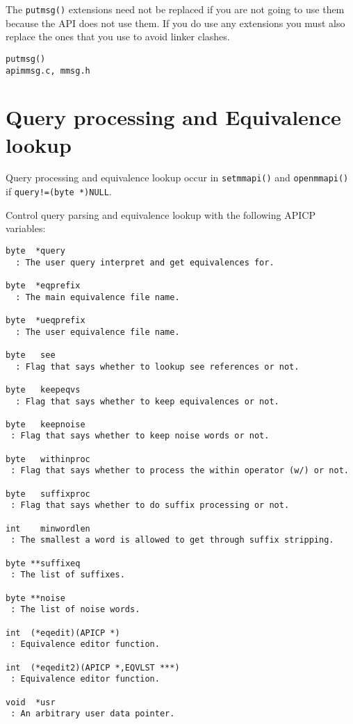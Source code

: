 The \verb`putmsg()` extensions need not be replaced if you are not going
to use them because the API does not use them.  If you do use any
extensions you must also replace the ones that you use to avoid
linker clashes.

\SEE
\begin{verbatim}
putmsg()
apimmsg.c, mmsg.h
\end{verbatim}

\section {Query processing and Equivalence lookup}

Query processing and equivalence lookup occur in \verb`setmmapi()` and
\verb`openmmapi()` if \verb`query!=(byte *)NULL`.

Control query parsing and equivalence lookup with the following
APICP variables:

\begin{verbatim}
byte  *query
  : The user query interpret and get equivalences for.

byte  *eqprefix
  : The main equivalence file name.

byte  *ueqprefix
  : The user equivalence file name.

byte   see
  : Flag that says whether to lookup see references or not.

byte   keepeqvs
  : Flag that says whether to keep equivalences or not.

byte   keepnoise
 : Flag that says whether to keep noise words or not.

byte   withinproc
 : Flag that says whether to process the within operator (w/) or not.

byte   suffixproc
 : Flag that says whether to do suffix processing or not.

int    minwordlen
 : The smallest a word is allowed to get through suffix stripping.

byte **suffixeq
 : The list of suffixes.

byte **noise
 : The list of noise words.

int  (*eqedit)(APICP *)
 : Equivalence editor function.

int  (*eqedit2)(APICP *,EQVLST ***)
 : Equivalence editor function.

void  *usr
 : An arbitrary user data pointer.

\end{verbatim}

